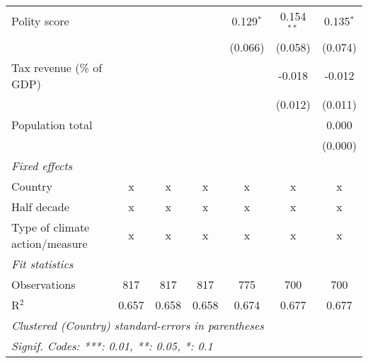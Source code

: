 \begin{tabular}{lcccccc}
   Polity score                                                              &         &         &         & 0.129$^{*}$   & 0.154$^{**}$   & 0.135$^{*}$\\   
                                                                             &         &         &         & (0.066)       & (0.058)        & (0.074)\\   
   Tax revenue (\% of GDP)                                                   &         &         &         &               & -0.018         & -0.012\\   
                                                                             &         &         &         &               & (0.012)        & (0.011)\\   
   Population total                                                          &         &         &         &               &                & 0.000\\   
                                                                             &         &         &         &               &                & (0.000)\\   
   \emph{Fixed effects}\\
   Country                                                                   & x       & x       & x       & x             & x              & x\\  
   Half decade                                                               & x       & x       & x       & x             & x              & x\\  
   Type of climate action/measure                                            & x       & x       & x       & x             & x              & x\\  
   \midrule \emph{Fit statistics}\\
   Observations                                                              & 817     & 817     & 817     & 775           & 700            & 700\\  
   R$^2$                                                                     & 0.657   & 0.658   & 0.658   & 0.674         & 0.677          & 0.677\\  
   \midrule
   \multicolumn{7}{l}{\emph{Clustered (Country) standard-errors in parentheses}}\\
   \multicolumn{7}{l}{\emph{Signif. Codes: ***: 0.01, **: 0.05, *: 0.1}}\\
\end{tabular}
\par\endgroup


